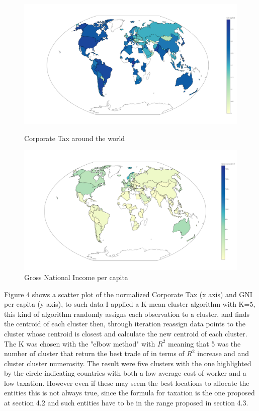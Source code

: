 \documentclass{article}
\begin{document}
\begin{figure}[ht]
\centering
\begin{minipage}{.5\textwidth}
  \centering
  \includegraphics[width=1\linewidth]{Images/CTworld.png}
  \caption{Corporate Tax around the world}
  \label{fig:test1}
\end{minipage}%
\begin{minipage}{.5\textwidth}
  \centering
  \includegraphics[width=1\linewidth]{Images/GNIworld.png}
  \caption{Gross National Income per capita}
  \label{fig:test2}
\end{minipage}
\end{figure}

Figure 4 shows a scatter plot of the normalized Corporate Tax (x axis) and GNI per capita (y axis), to such data I applied a K-mean cluster algorithm with K=5, this kind of algorithm randomly assigns each observation to a cluster, and finds the centroid of each cluster then, through iteration reassign data points to the cluster whose centroid is closest and calculate the new centroid of each cluster. The K was chosen with the "elbow method" with $R^2$ meaning that 5 was the number of cluster that return the best trade of in terms of $R^2$ increase and and cluster cluster numerosity. 
The result were five clusters with the one highlighted by the circle indicating countries with both a low average cost of worker and a low taxation. However even if these may seem the best locations to allocate the entities this is not always true, since the formula for taxation is the one proposed at section 4.2 and such entities have to be in the range proposed in section 4.3. 
\end{document}
